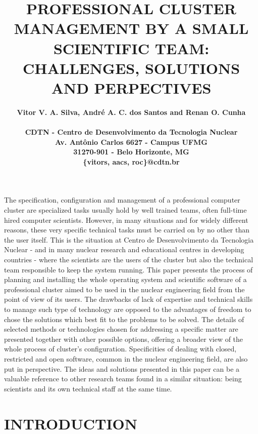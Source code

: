 \documentclass[twoside,a4paper,12pt,english,draft]{inac17}
\title{PROFESSIONAL CLUSTER MANAGEMENT BY A SMALL SCIENTIFIC TEAM: CHALLENGES, SOLUTIONS
AND PERPECTIVES}
\author{
  \bf{Vitor V. A. Silva, Andr\'e A. C. dos Santos and Renan O. Cunha}\\ \\
  CDTN - Centro de Desenvolvimento da Tecnologia Nuclear\\
  Av. Ant\^onio Carlos 6627 - Campus UFMG\\
  31270-901 - Belo Horizonte, MG\\
  \{vitors, aacs, roc\}@cdtn.br}
\begin{document}
\maketitle

\pagestyle{myheadings}
\thispagestyle{empty}
\markboth{}{}


\thispagestyle{empty}


\begin{abstract_full_paper}
  The specification, configuration and management of a professional computer cluster are specialized
tasks usually hold by well trained teams, often full-time hired computer scientists. However, in
many situations and for widely different reasons, these very specific technical tasks must
be carried on by no other than the user itself. This is the situation at Centro de Desenvolvimento
da Tecnologia Nuclear - and in many nuclear research and educational centres in developing countries -
where the scientists are the users of the cluster but also the technical
team responsible to keep the system running. This paper presents the process of planning
and installing the whole operating system and scientific software of a professional cluster
aimed to be used in the nuclear engineering field from the point of view of its users.
The drawbacks of lack of expertise and technical skills to
manage such type of technology are opposed to the advantages of freedom to chose the solutions
which best fit to the problems to be solved. The details of selected methods or technologies
chosen for addressing a specific matter are presented together with other possible options, 
offering a broader view of the whole process of cluster's configuration. Specificities
of dealing with closed, restricted and open software, common in the nuclear engineering field,
are also put in perspective. The ideas and solutions presented in this paper can be a
valuable reference to other research teams found in a similar situation:
being scientists and its own technical staff at the same time.
\end{abstract_full_paper}


\section{INTRODUCTION}\label{int}
\end{document}
